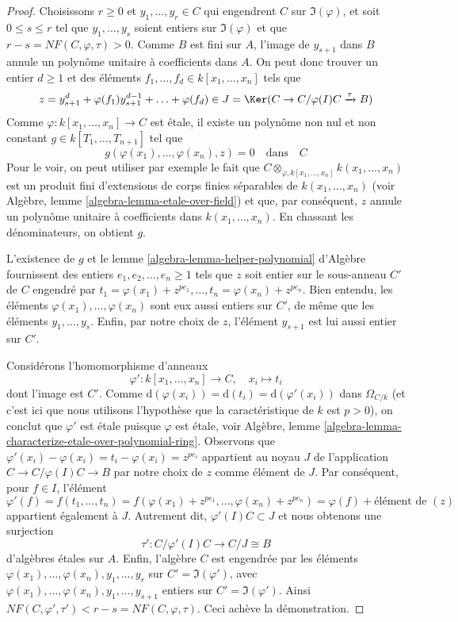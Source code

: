 \begin{proof}
Choisissons $r \geq 0$ et $y_1, \ldots, y_r \in C$ qui engendrent
$C$ sur $\Im(\varphi)$, et soit $0 \leq s \leq r$ tel que
$y_1, \ldots, y_s$ soient entiers sur $\Im(\varphi)$
et que $r - s = NF(C, \varphi, \tau) > 0$.
Comme $B$ est fini sur $A$, l'image de $y_{s + 1}$ dans $B$
annule un polynôme unitaire à coefficients dans $A$. On peut donc trouver
un entier $d \geq 1$ et des éléments $f_1, \ldots, f_d \in k[x_1, \ldots, x_n]$
tels que
$$
z = y_{s + 1}^d + \varphi(f_1) y_{s + 1}^{d - 1} + \ldots + \varphi(f_d) \in
J = \Ker(C \to C/\varphi(I)C \xrightarrow{\tau} B)
$$
Comme $\varphi : k[x_1, \ldots, x_n] \to C$ est \'etale, il existe un
polynôme non nul et non constant $g \in k[T_1, \ldots, T_{n + 1}]$
tel que
$$
g(\varphi(x_1), \ldots, \varphi(x_n), z) = 0
\quad\text{dans}\quad
C
$$
Pour le voir, on peut utiliser par exemple le fait que
$C \otimes_{\varphi, k[x_1, \ldots, x_n]} k(x_1, \ldots, x_n)$
est un produit fini d'extensions de corps finies séparables
de $k(x_1, \ldots, x_n)$
(voir Algèbre, lemme \ref{algebra-lemma-etale-over-field})
et que, par conséquent, $z$ annule un polynôme unitaire
à coefficients dans $k(x_1, \ldots, x_n)$. En chassant les dénominateurs,
on obtient $g$.

\medskip\noindent
L'existence de $g$ et le
lemme \ref{algebra-lemma-helper-polynomial} d'Algèbre
fournissent des entiers $e_1, e_2, \ldots, e_n \geq 1$ tels que
$z$ soit entier sur le sous-anneau $C'$ de $C$ engendré par
$t_1 = \varphi(x_1) + z^{pe_1}, \ldots, t_n = \varphi(x_n) + z^{pe_n}$.
Bien entendu, les éléments $\varphi(x_1), \ldots, \varphi(x_n)$
sont eux aussi entiers sur $C'$, de même que les éléments
$y_1, \ldots, y_s$. Enfin, par notre choix de $z$, l'élément
$y_{s + 1}$ est lui aussi entier sur $C'$.

\medskip\noindent
Considérons l'homomorphisme d'anneaux
$$
\varphi' : k[x_1, \ldots, x_n] \longrightarrow C, \quad
x_i \longmapsto t_i
$$
dont l'image est $C'$. Comme
$\text{d}(\varphi(x_i)) = \text{d}(t_i) = \text{d}(\varphi'(x_i))$
dans $\Omega_{C/k}$ (et c'est ici que nous utilisons l'hypothèse que la caractéristique de $k$
est $p > 0$), on conclut que $\varphi'$ est \'etale puisque $\varphi$ est
\'etale, voir
Algèbre, lemme \ref{algebra-lemma-characterize-etale-over-polynomial-ring}.
Observons que $\varphi'(x_i) - \varphi(x_i) = t_i - \varphi(x_i) = z^{pe_i}$
appartient au noyau $J$ de l'application $C \to C/\varphi(I)C \to B$ par notre
choix de $z$ comme élément de $J$.
Par conséquent, pour $f \in I$, l'élément
$$
\varphi'(f) =
f(t_1, \ldots, t_n) =
f(\varphi(x_1) + z^{pe_1}, \ldots, \varphi(x_n) + z^{pe_n}) =
\varphi(f) + \text{élément de }(z)
$$
appartient également à $J$. Autrement dit, $\varphi'(I)C \subset J$ et
nous obtenons une surjection
$$
\tau' : C/\varphi'(I)C \longrightarrow C/J \cong B
$$
d'algèbres \'etales sur $A$. Enfin, l'algèbre
$C$ est engendrée par les éléments
$\varphi(x_1), \ldots, \varphi(x_n), y_1, \ldots, y_r$
sur $C' = \Im(\varphi')$, avec
$\varphi(x_1), \ldots, \varphi(x_n), y_1, \ldots, y_{s + 1}$
entiers sur $C' = \Im(\varphi')$. Ainsi
$NF(C, \varphi', \tau') < r - s = NF(C, \varphi, \tau)$.
Ceci achève la démonstration.
\end{proof}

